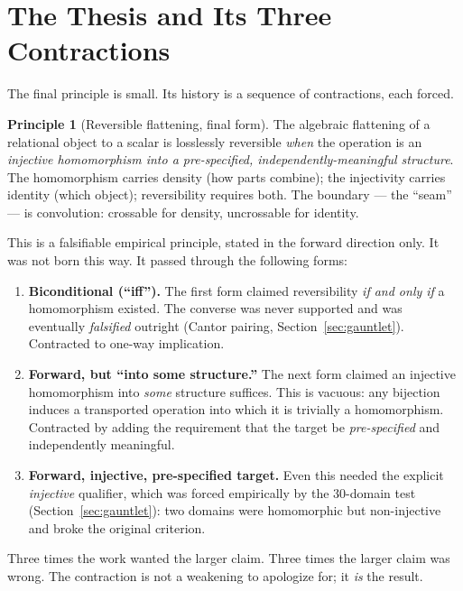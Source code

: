 \documentclass[11pt,a4paper]{article}
\theoremstyle{definition}
\newtheorem{principle}{Principle}
\theoremstyle{plain}
\begin{document}
\section{The Thesis and Its Three Contractions}\label{sec:thesis}

The final principle is small. Its history is a sequence of contractions, each forced.

\begin{principle}[Reversible flattening, final form]
The algebraic flattening of a relational object to a scalar is losslessly reversible
\emph{when} the operation is an \emph{injective homomorphism into a pre-specified,
independently-meaningful structure}. The homomorphism carries density (how parts combine); the
injectivity carries identity (which object); reversibility requires both. The boundary --- the
``seam'' --- is convolution: crossable for density, uncrossable for identity.
\end{principle}

This is a falsifiable empirical principle, stated in the forward direction only. It was not
born this way. It passed through the following forms:

\begin{enumerate}[leftmargin=1.6em]
\item \textbf{Biconditional (``iff'').} The first form claimed reversibility \emph{if and only if}
a homomorphism existed. The converse was never supported and was eventually \emph{falsified}
outright (Cantor pairing, Section~\ref{sec:gauntlet}). Contracted to one-way implication.
\item \textbf{Forward, but ``into some structure.''} The next form claimed an injective
homomorphism into \emph{some} structure suffices. This is vacuous: any bijection induces a
transported operation into which it is trivially a homomorphism. Contracted by adding the
requirement that the target be \emph{pre-specified} and independently meaningful.
\item \textbf{Forward, injective, pre-specified target.} Even this needed the explicit
\emph{injective} qualifier, which was forced empirically by the 30-domain test
(Section~\ref{sec:gauntlet}): two domains were homomorphic but non-injective and broke the
original criterion.
\end{enumerate}

Three times the work wanted the larger claim. Three times the larger claim was wrong. The
contraction is not a weakening to apologize for; it \emph{is} the result.
\end{document}
